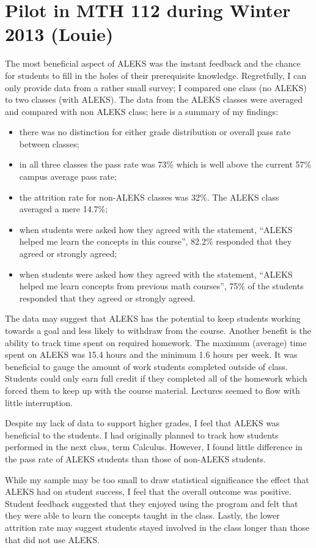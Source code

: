 \section{Pilot in MTH 112 during Winter 2013 (Louie)}
The most beneficial aspect of ALEKS was the instant feedback and the chance for students to fill in the holes of their prerequisite knowledge. Regretfully, I can only provide data from a rather small survey; I compared one class (no ALEKS) to two classes (with ALEKS). The data from the ALEKS classes were averaged and compared with non ALEKS class; here is a summary of my findings:
\begin{itemize}
	\item there was no distinction for either grade distribution or overall pass rate between classes;
	\item in all three classes the pass rate was 73\% which is well above the current 57\% campus average pass rate;
	\item the attrition rate for non-ALEKS classes was 32\%. The ALEKS class averaged a mere 14.7\%;
\item 	when students were asked how they agreed with the statement, ``ALEKS helped me learn the concepts in this course'',  82.2\% responded that they agreed or strongly agreed;
\item	when students were asked how they agreed with the statement, ``ALEKS helped me learn concepts from previous math courses'', 75\% of the students responded that they agreed or strongly agreed.
\end{itemize}
The data may suggest that ALEKS has the potential to keep students working towards a goal and less likely to withdraw from the course. Another benefit is the ability to track time spent on required homework. The maximum (average) time spent on ALEKS was 15.4 hours and the minimum 1.6 hours per week. It was beneficial to gauge the amount of work students completed outside of class. Students could only earn full credit if they completed all of the homework which forced them to keep up with the course material. Lectures seemed to flow with little interruption. 

Despite my lack of data to support higher grades, I feel that ALEKS was beneficial to the students. I had originally planned to track how students performed in the next class,  term Calculus. However, I found little difference in the pass rate of ALEKS students than those of non-ALEKS students. 

While my sample may be too small to draw statistical significance the effect that ALEKS had on student success, I feel that the overall outcome was positive. Student feedback suggested that they enjoyed using the program and felt that they were able to learn the concepts taught in the class. Lastly, the lower attrition rate may suggest students stayed involved in the class longer than those that did not use ALEKS. 